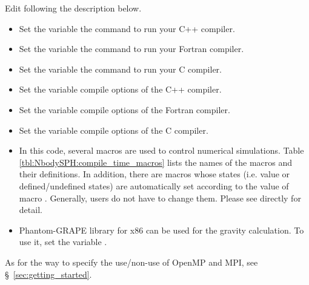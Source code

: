 \label{s3sec:NbodySPH_Makefile}
Edit  following the description below.
\begin{itemize}
\item Set the variable  the command to run your C++ compiler.
\ifFtn %
\item Set the variable  the command to run your Fortran compiler.
\endifFtn
\ifC %
\item Set the variable  the command to run your C compiler.
\endifC
\item Set the variable  compile options of the C++ compiler.
\ifFtn %
\item Set the variable  compile options of the Fortran compiler.
\endifFtn
\ifC %
\item Set the variable  compile options of the C compiler.
\endifC
\item In this code, several macros are used to control numerical simulations. Table \ref{tbl:NbodySPH:compile_time_macros} lists the names of the macros and their definitions. In addition, there are macros whose states (i.e. value or defined/undefined states) are automatically set according to the value of macro . Generally, users do not have to change them. Please see  directly for detail.
\item Phantom-GRAPE library for x86 can be used for the gravity calculation. To use it, set the variable  .
\end{itemize}
As for the way to specify the use/non-use of OpenMP and MPI, see \S~\ref{sec:getting_started}.


